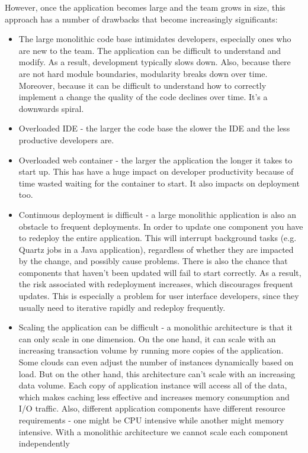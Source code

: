 However, once the application becomes large and the team grows in size, this approach has a number 
of drawbacks that become increasingly significants:

\begin{itemize}
    \item The large monolithic code base intimidates developers, especially ones who are new to the team. The application can be difficult to understand and modify. As a result, development typically slows down. Also, because there are not hard module boundaries, modularity breaks down over time. Moreover, because it can be difficult to understand how to correctly implement a change the quality of the code declines over time. It's a downwards spiral.

    \item Overloaded IDE - the larger the code base the slower the IDE and the less productive developers are.

    \item Overloaded web container - the larger the application the longer it takes to start up. 
	This has have a huge impact on developer productivity because of time wasted waiting for the container to start. 
	It also impacts on deployment too.

    \item Continuous deployment is difficult - a large monolithic application is also an obstacle to frequent deployments. In order to update one component you have to redeploy the entire application. This will interrupt background tasks (e.g. Quartz jobs in a Java application), regardless of whether they are impacted by the change, and possibly cause problems. There is also the chance that components that haven't been updated will fail to start correctly. As a result, the risk associated with redeployment increases, which discourages frequent updates. This is especially a problem for user interface developers, since they usually need to iterative rapidly and redeploy frequently.

    \item Scaling the application can be difficult - a monolithic architecture is that it can only scale in one dimension. On the one hand, it can scale with an increasing transaction volume by running more copies of the application. Some clouds can even adjust the number of instances dynamically based on load. But on the other hand, this architecture can't scale with an increasing data volume. Each copy of application instance will access all of the data, which makes caching less effective and increases memory consumption and I/O traffic. Also, different application components have different resource requirements - one might be CPU intensive while another might memory intensive. With a monolithic architecture we cannot scale each component independently


\end{itemize}
